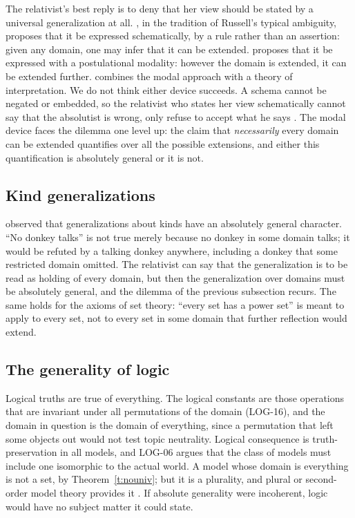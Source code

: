 \documentclass{situationist-preprint}
\begin{document}
The relativist's best reply is to deny that her view should be stated by a universal generalization at all. \citet{Lavine2006}, in the tradition of Russell's typical ambiguity, proposes that it be expressed schematically, by a rule rather than an assertion: given any domain, one may infer that it can be extended. \citet{Fine2006} proposes that it be expressed with a postulational modality: however the domain is extended, it can be extended further. \citet{Studd2019} combines the modal approach with a theory of interpretation. We do not think either device succeeds. A schema cannot be negated or embedded, so the relativist who states her view schematically cannot say that the absolutist is wrong, only refuse to accept what he says \citep{Williamson2003}. The modal device faces the dilemma one level up: the claim that \emph{necessarily} every domain can be extended quantifies over all the possible extensions, and either this quantification is absolutely general or it is not.

\subsection{Kind generalizations}

\citet{Williamson2003} observed that generalizations about kinds have an absolutely general character. \enquote{No donkey talks} is not true merely because no donkey in some domain talks; it would be refuted by a talking donkey anywhere, including a donkey that some restricted domain omitted. The relativist can say that the generalization is to be read as holding of every domain, but then the generalization over domains must be absolutely general, and the dilemma of the previous subsection recurs. The same holds for the axioms of set theory: \enquote{every set has a power set} is meant to apply to every set, not to every set in some domain that further reflection would extend.

\subsection{The generality of logic}

Logical truths are true of everything. The logical constants are those operations that are invariant under all permutations of the domain (LOG-16), and the domain in question is the domain of everything, since a permutation that left some objects out would not test topic neutrality. Logical consequence is truth-preservation in all models, and LOG-06 argues that the class of models must include one isomorphic to the actual world. A model whose domain is everything is not a set, by Theorem~\ref{t:nouniv}; but it is a plurality, and plural or second-order model theory provides it \citep{Boolos1985,RayoUzquiano1999,RayoWilliamson2003}. If absolute generality were incoherent, logic would have no subject matter it could state.
\end{document}
